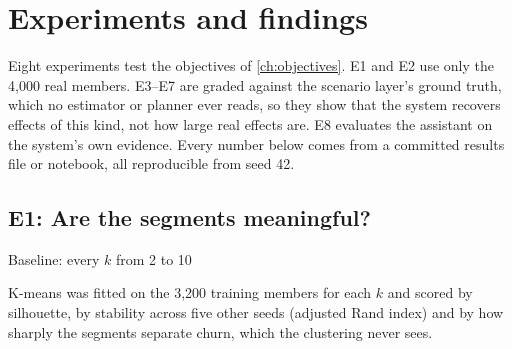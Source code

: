 \chapter{Experiments and findings}
\label{ch:experiments}

Eight experiments test the objectives of \cref{ch:objectives}. E1 and E2 use only the 4,000 real members. E3--E7 are graded against the scenario layer's ground truth, which no estimator or planner ever reads, so they show that the system recovers effects of this kind, not how large real effects are. E8 evaluates the assistant on the system's own evidence. Every number below comes from a committed results file or notebook, all reproducible from seed 42.

\section{E1: Are the segments meaningful?}
\label{sec:e1}
\quad\textsf{\small Baseline: every $k$ from 2 to 10}

K-means was fitted on the 3,200 training members for each $k$ and scored by silhouette, by stability across five other seeds (adjusted Rand index) and by how sharply the segments separate churn, which the clustering never sees.

